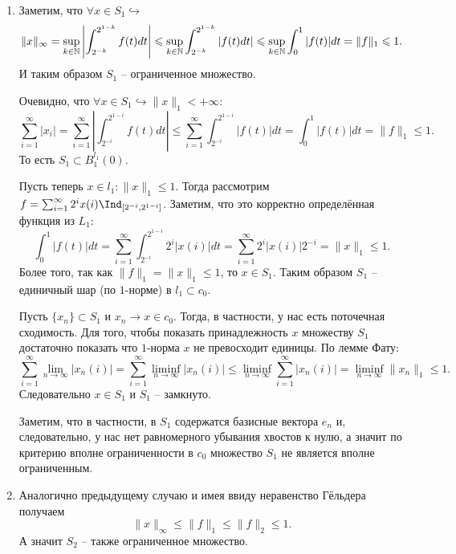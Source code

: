 \begin{solve}
    \leavevmode
    \begin{enumerate}
        \item Заметим, что $\forall x \in S_1 \hookrightarrow$
        \[
            \|x\|_\infty = \sup_{k \in \mathbb{N}} \left|\int_{2^{-k}}^{2^{1 - k}}f(t)dt\right| \leqslant \sup\limits_{k \in \mathbb{N}} \int_{2^{-k}}^{2^{1- k}}|f(t)dt| \leqslant \sup_{k \in \mathbb{N}} \int_0^1 |f(t)|dt = \|f\|_1 \leqslant 1.
        \]
        И таким образом $S_1$ -- ограниченное множество.

        Очевидно, что $\forall x \in S_1 \hookrightarrow \|x\|_1 < +\infty\colon$
        \[
            \sum_{i = 1}^{\infty} |x_i| = \sum_{i = 1}^{\infty} \left|\int_{2^{-i}}^{2^{1 - i}}f(t)dt\right| \leq \sum_{i = 1}^{\infty}\int_{2^{-i}}^{2^{1 - i}}|f(t)|dt = \int_0^1 |f(t)|dt = \|f\|_1 \leq 1.
        \]
        То есть $S_1 \subset B^{l_1}_1(0)$.

        Пусть теперь $x \in l_1\colon \|x\|_1 \leq 1$. Тогда рассмотрим $f = \sum_{i = 1}^{\infty} 2^{i}x(i)\Ind_{[2^{-i}, 2^{1 - i}]}$. Заметим, что это корректно определённая функция из $L_1\colon$
        \[
            \int_0^1 |f(t)|dt = \sum_{i = 1}^{\infty} \int_{2^{-i}}^{2^{1-i}}2^{i}|x(i)|dt = \sum_{i = 1}^{\infty} 2^{i}|x(i)|2^{-i} = \|x\|_1 \leq 1.
        \]
        Более того, так как $\|f\|_1 = \|x\|_1 \leq 1$, то $x \in S_1$.
        Таким образом $S_1$ -- единичный шар (по $1$-норме) в $l_1 \subset c_0$.

        Пусть $\{x_n\} \subset S_1$ и $x_n \rightarrow x \in c_0$. Тогда, в частности, у нас есть поточечная сходимость. Для того, чтобы показать принадлежность $x$ множеству $S_1$ достаточно показать что $1$-норма $x$ не превосходит единицы. По лемме Фату:
        \[
            \sum_{i = 1}^{\infty} \lim_{n \rightarrow\infty} |x_n(i)| = \sum_{i = 1}^{\infty} \liminf\limits_{n \rightarrow \infty} |x_n(i)| \leq \liminf\limits_{n \rightarrow \infty} \sum_{i = 1}^{\infty} |x_n(i)| = \liminf\limits_{n \rightarrow \infty} \|x_n\|_1 \leq 1.
        \]
        Следовательно $x \in S_1$ и $S_1$ -- замкнуто.

        Заметим, что в частности, в $S_1$ содержатся базисные вектора $e_n$ и, следовательно, у нас нет равномерного убывания хвостов к нулю, а значит по критерию вполне ограниченности в $c_0$ множество $S_1$ не является вполне ограниченным.
        \item Аналогично предыдущему случаю и имея ввиду неравенство Гёльдера получаем
        \[
            \|x\|_\infty \leq \|f\|_1 \leq \|f\|_2 \leq 1.
        \]
        А значит $S_2$ -- также ограниченное множество.


\end{enumerate}
\end{solve}
